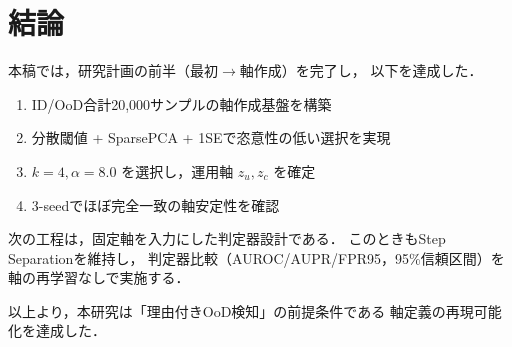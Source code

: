 \documentclass[11pt,a4paper]{article}
\begin{document}
\section{結論}
本稿では，研究計画の前半（最初$\rightarrow$軸作成）を完了し，
以下を達成した．

\begin{enumerate}
  \item ID/OoD合計20,000サンプルの軸作成基盤を構築
  \item 分散閾値 + SparsePCA + 1SEで恣意性の低い選択を実現
  \item $k=4,\alpha=8.0$ を選択し，運用軸 $z_u,z_c$ を確定
  \item 3-seedでほぼ完全一致の軸安定性を確認
\end{enumerate}

次の工程は，固定軸を入力にした判定器設計である．
このときもStep Separationを維持し，
判定器比較（AUROC/AUPR/FPR95，95\%信頼区間）を
軸の再学習なしで実施する．

以上より，本研究は「理由付きOoD検知」の前提条件である
軸定義の再現可能化を達成した．
\end{document}
